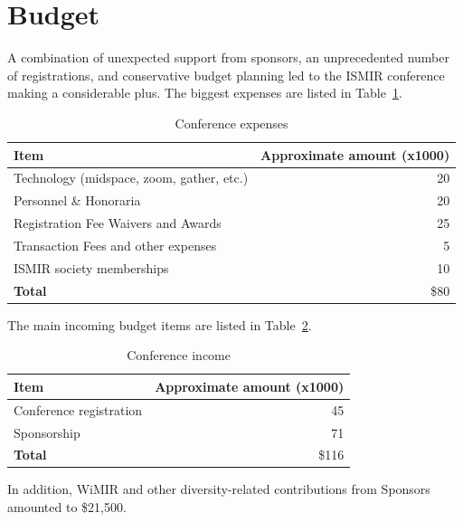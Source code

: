 \documentclass[%
10pt,								%
titlepage,						%
]
{scrartcl}
\begin{document}
\section{Budget}
    A combination of unexpected support from sponsors, an unprecedented number of registrations, and conservative budget planning led to the ISMIR conference making a considerable plus. The biggest expenses are listed in Table~\ref{tab:expenses}.
                \begin{table}
                    \centering
                    \begin{tabular}{l|r}
                        \textbf{Item} & \textbf{Approximate amount (x1000)}\\ \hline
                        
                        Technology (midspace, zoom, gather, etc.) & 20 \\
                        Personnel \& Honoraria & 20 \\
                        Registration Fee Waivers and Awards & 25 \\
                        Transaction Fees and other expenses & 5 \\
                        ISMIR society memberships & 10 \\
                        \hline
                        \textbf{Total} & \$80
                    
                    \end{tabular}
                    \caption{Conference expenses}
                    \label{tab:expenses}
                \end{table}
                The main incoming budget items are listed in Table~\ref{tab:income}.
                \begin{table}
                    \centering
                    \begin{tabular}{l|r}
                        \textbf{Item} & \textbf{Approximate amount (x1000)}\\ \hline
                        
                        Conference registration & 45 \\
                        Sponsorship & 71 \\
                        \hline
                        \textbf{Total} & \$116
                    
                    \end{tabular}
                    \caption{Conference income}
                    \label{tab:income}
                \end{table}
                In addition, WiMIR and other diversity-related contributions from Sponsors amounted to \$21,500.
                
\end{document}
